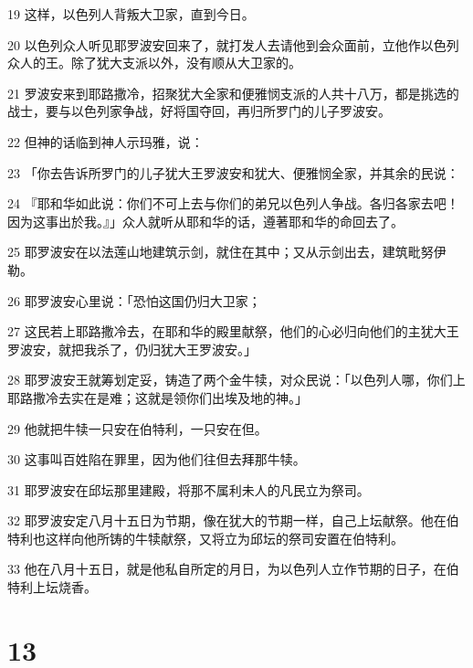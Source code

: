 \par 19 这样，以色列人背叛大卫家，直到今日。
\par 20 以色列众人听见耶罗波安回来了，就打发人去请他到会众面前，立他作以色列众人的王。除了犹大支派以外，没有顺从大卫家的。
\par 21 罗波安来到耶路撒冷，招聚犹大全家和便雅悯支派的人共十八万，都是挑选的战士，要与以色列家争战，好将国夺回，再归所罗门的儿子罗波安。
\par 22 但神的话临到神人示玛雅，说：
\par 23 「你去告诉所罗门的儿子犹大王罗波安和犹大、便雅悯全家，并其余的民说：
\par 24 『耶和华如此说：你们不可上去与你们的弟兄以色列人争战。各归各家去吧！因为这事出於我。』」众人就听从耶和华的话，遵著耶和华的命回去了。
\par 25 耶罗波安在以法莲山地建筑示剑，就住在其中；又从示剑出去，建筑毗努伊勒。
\par 26 耶罗波安心里说：「恐怕这国仍归大卫家；
\par 27 这民若上耶路撒冷去，在耶和华的殿里献祭，他们的心必归向他们的主犹大王罗波安，就把我杀了，仍归犹大王罗波安。」
\par 28 耶罗波安王就筹划定妥，铸造了两个金牛犊，对众民说：「以色列人哪，你们上耶路撒冷去实在是难；这就是领你们出埃及地的神。」
\par 29 他就把牛犊一只安在伯特利，一只安在但。
\par 30 这事叫百姓陷在罪里，因为他们往但去拜那牛犊。
\par 31 耶罗波安在邱坛那里建殿，将那不属利未人的凡民立为祭司。
\par 32 耶罗波安定八月十五日为节期，像在犹大的节期一样，自己上坛献祭。他在伯特利也这样向他所铸的牛犊献祭，又将立为邱坛的祭司安置在伯特利。
\par 33 他在八月十五日，就是他私自所定的月日，为以色列人立作节期的日子，在伯特利上坛烧香。

\chapter{13}

